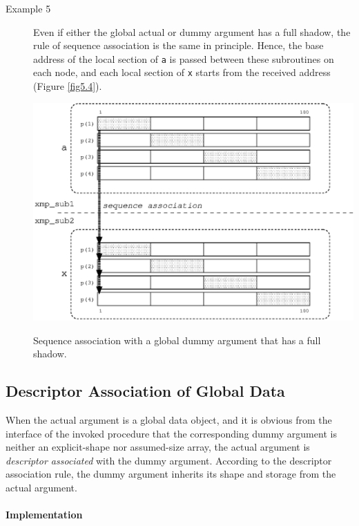 \begin{description}
\item[Example 5]

	   Even if either the global actual or dummy argument has a full
	   shadow, the rule of sequence association is the same in
	   principle. Hence, the base address of the local section of
	   {\tt a} is passed between these subroutines on each node, and
	   each local section of {\tt x} starts from the received
	   address (Figure \ref{fig5.4}).

\begin{myfigure}
 \includegraphics[scale=0.7]{figs/fig5.4.eps}
 \caption{Sequence association with a global dummy argument that has a
 full shadow.}
 \label{fig5.4}
\end{myfigure}

\end{description}


\subsection{Descriptor Association of Global Data}

When the actual argument is a global data object, and it is obvious from the
interface of the invoked procedure that the corresponding dummy argument
is neither an explicit-shape nor assumed-size array, the actual
argument is {\it descriptor associated} with the dummy
argument. According to the descriptor association rule, the dummy
argument inherits its shape and storage from the actual argument.

\paragraph*{Implementation}

